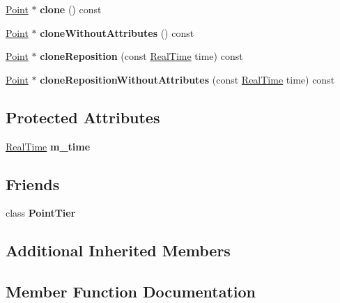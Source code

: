 \begin{DoxyCompactItemize}
\mbox{\label{class_point_ab995552c7336b829ca40b643db4d8a93}} 
\hyperlink{class_point}{Point} $\ast$ {\bfseries clone} () const
\item 
\mbox{\label{class_point_ac8380c96fc7773722ba5c0a72f37dc2e}} 
\hyperlink{class_point}{Point} $\ast$ {\bfseries clone\+Without\+Attributes} () const
\item 
\mbox{\label{class_point_ab7c6bf82493b4ee70e06b560d73ed657}} 
\hyperlink{class_point}{Point} $\ast$ {\bfseries clone\+Reposition} (const \hyperlink{struct_real_time}{Real\+Time} time) const
\item 
\mbox{\label{class_point_a9d5ac0c075f574479e55a85eb43dc000}} 
\hyperlink{class_point}{Point} $\ast$ {\bfseries clone\+Reposition\+Without\+Attributes} (const \hyperlink{struct_real_time}{Real\+Time} time) const
\end{DoxyCompactItemize}
\subsection*{Protected Attributes}
\begin{DoxyCompactItemize}
\item 
\mbox{\label{class_point_a0027325f1602de4d38e32128ee684d69}} 
\hyperlink{struct_real_time}{Real\+Time} {\bfseries m\+\_\+time}
\end{DoxyCompactItemize}
\subsection*{Friends}
\begin{DoxyCompactItemize}
\item 
\mbox{\label{class_point_ab5946b25071f4dabec3b8555acc279f5}} 
class {\bfseries Point\+Tier}
\end{DoxyCompactItemize}
\subsection*{Additional Inherited Members}


\subsection{Member Function Documentation}
\mbox{\label{class_point_a0ff561e393cdf7475126b96de6106d12}} 
